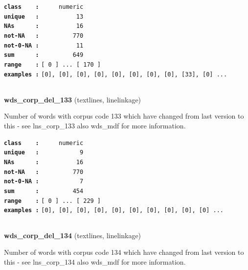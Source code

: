 \documentclass[]{article}
\begin{document}
\textbf{\texttt{class\ \ \ \ :}} \texttt{~~~~~numeric}\\
\textbf{\texttt{unique\ \ \ :}} \texttt{~~~~~~~~~~13}\\
\textbf{\texttt{NAs\ \ \ \ \ \ :}} \texttt{~~~~~~~~~~16}\\
\textbf{\texttt{not-NA\ \ \ :}} \texttt{~~~~~~~~~770}\\
\textbf{\texttt{not-0-NA\ :}} \texttt{~~~~~~~~~~11}\\
\textbf{\texttt{sum\ \ \ \ \ \ :}} \texttt{~~~~~~~~~649}\\
\textbf{\texttt{range\ \ \ \ :}}
\texttt{{[}\ 0\ {]}\ ...\ {[}\ 170\ {]}}\\
\textbf{\texttt{examples\ :}}
\texttt{{[}0{]},\ {[}0{]},\ {[}0{]},\ {[}0{]},\ {[}0{]},\ {[}0{]},\ {[}0{]},\ {[}0{]},\ {[}33{]},\ {[}0{]}\ ...}\\

~

\textbf{wds\_corp\_del\_133} (textlines, linelinkage)

Number of words with corpus code 133 which have changed from last
version to this - see lns\_corp\_133 also wds\_mdf for more information.

\textbf{\texttt{class\ \ \ \ :}} \texttt{~~~~~numeric}\\
\textbf{\texttt{unique\ \ \ :}} \texttt{~~~~~~~~~~~9}\\
\textbf{\texttt{NAs\ \ \ \ \ \ :}} \texttt{~~~~~~~~~~16}\\
\textbf{\texttt{not-NA\ \ \ :}} \texttt{~~~~~~~~~770}\\
\textbf{\texttt{not-0-NA\ :}} \texttt{~~~~~~~~~~~7}\\
\textbf{\texttt{sum\ \ \ \ \ \ :}} \texttt{~~~~~~~~~454}\\
\textbf{\texttt{range\ \ \ \ :}}
\texttt{{[}\ 0\ {]}\ ...\ {[}\ 229\ {]}}\\
\textbf{\texttt{examples\ :}}
\texttt{{[}0{]},\ {[}0{]},\ {[}0{]},\ {[}0{]},\ {[}0{]},\ {[}0{]},\ {[}0{]},\ {[}0{]},\ {[}0{]},\ {[}0{]}\ ...}\\

~

\textbf{wds\_corp\_del\_134} (textlines, linelinkage)

Number of words with corpus code 134 which have changed from last
version to this - see lns\_corp\_134 also wds\_mdf for more information.
\end{document}
